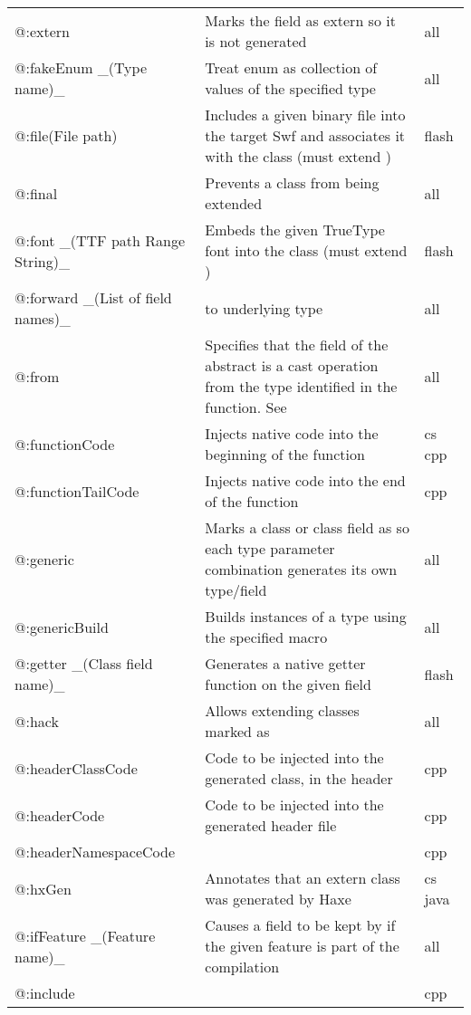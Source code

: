 \begin{center}
\begin{tabular}{| l | l | l |}
	@:extern  &  Marks the field as extern so it is not generated  &  all \\
	@:fakeEnum \_(Type name)\_  &  Treat enum as collection of values of the specified type  &  all \\
	@:file(File path)  &  Includes a given binary file into the target Swf and associates it with the class (must extend \expr{flash.utils.ByteArray})  &  flash \\
	@:final  &  Prevents a class from being extended  &  all \\
	@:font \_(TTF path Range String)\_  &  Embeds the given TrueType font into the class (must extend \expr{flash.text.Font})  &  flash \\
	@:forward \_(List of field names)\_  &  \tref{Forwards field access}{types-abstract-forward} to underlying type  &  all \\
	@:from   &  Specifies that the field of the abstract is a cast operation from the type identified in the function. See \tref{Implicit Casts}{types-abstract-implicit-casts}  &  all \\
	@:functionCode  &  Injects native code into the beginning of the function   &  cs cpp \\
	@:functionTailCode  &  Injects native code into the end of the function  &  cpp \\
	@:generic &  Marks a class or class field as \tref{generic}{type-system-generic} so each type parameter combination generates its own type/field  &  all \\
	@:genericBuild  &  Builds instances of a type using the specified macro   &  all \\
	@:getter \_(Class field name)\_  &  Generates a native getter function on the given field   &  flash \\
	@:hack   &  Allows extending classes marked as \expr{@:final}  &  all \\
	@:headerClassCode  &  Code to be injected into the generated class, in the header  &  cpp \\
	@:headerCode   &  Code to be injected into the generated header file  &  cpp \\
	@:headerNamespaceCode  &    &  cpp \\
	@:hxGen  &  Annotates that an extern class was generated by Haxe  &  cs  java \\
	@:ifFeature \_(Feature name)\_  &  Causes a field to be kept by \tref{DCE}{cr-dce} if the given feature is part of the compilation  &  all \\
	@:include &     &  cpp \\

\end{tabular}
\end{center}
